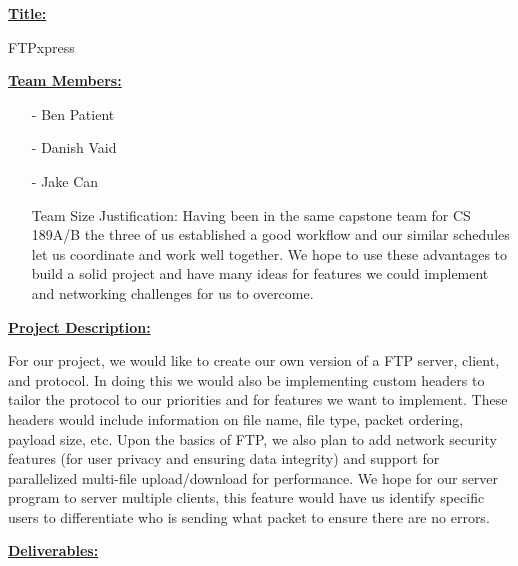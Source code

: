 \documentclass[12pt]{article}
\begin{document}
\begin{flushleft}
	\large{\underline{\textbf{Title:}}}
\end{flushleft}

	\indent FTPxpress

\begin{flushleft}
	\large{\underline{\textbf{Team Members:}}}
\end{flushleft}
	\vspace{-7.5px}

	\begin{itemize}[noitemsep,nolistsep] 
		\item [-] Ben Patient
		\item [-] Danish Vaid
		\item [-] Jake Can
	\end{itemize}
	
	\begin{itemize}[leftmargin=5.2cm]
		\item[Team Size Justification:]  Having been in the same capstone team for CS 189A/B the three of us established a good workflow and our similar schedules let us coordinate and work well together. We hope to use these advantages to build a solid project and have many ideas for features we could implement and networking challenges for us to overcome. 
	\end{itemize}


\begin{flushleft}
	\large{\underline{\textbf{Project Description:}}}
\end{flushleft}
	\vspace{-7.5px}

	For our project, we would like to create our own version of a FTP server, client, and protocol. In doing this we would also be implementing custom headers to tailor the protocol to our priorities and for features we want to implement. These headers would include information on file name, file type, packet ordering, payload size, etc. Upon the basics of FTP, we also plan to add network security features (for user privacy and ensuring data integrity) and support for parallelized multi-file upload/download for performance. We hope for our server program to server multiple clients, this feature would have us identify specific users to differentiate who is sending what packet to ensure there are no errors. 

\begin{flushleft}
	\large{\underline{\textbf{Deliverables:}}}
\end{flushleft}
	\vspace{-7.5px}
	
\end{document}
